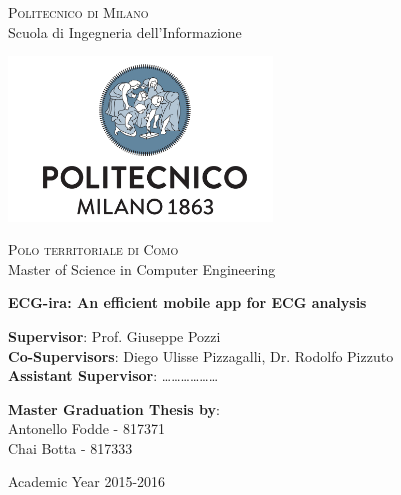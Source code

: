 \thispagestyle{empty}

\begin{center}

	\textsc{Politecnico di Milano}\\
 	Scuola di Ingegneria dell'Informazione\\  

 	\par\vskip 0.2cm

 	\includegraphics[width=7cm]{figures/polimi_logo.png}\\
  
 	\par\vskip 0.2cm  
  
  	\textsc{Polo territoriale di Como}\\
  	Master of Science in Computer Engineering\\  


  	\par\vskip 2cm
  	
\LARGE{ \bf	ECG-ira: An efficient mobile app for ECG analysis}


		
\end{center}

\par\vskip 1.5cm

\begin{flushleft}
  	\textbf{Supervisor}: Prof. Giuseppe Pozzi\\
  	\textbf{Co-Supervisors}: Diego Ulisse Pizzagalli, Dr. Rodolfo Pizzuto \\
    \textbf{Assistant Supervisor}: 	\dots\dots\dots\dots\dots\dots \\
\end{flushleft}

\par\vskip 1cm

\begin{flushleft}
  	\textbf{Master Graduation Thesis by}: \\
  	Antonello Fodde - 817371 \\ 
  	Chai Botta - 817333 \\  
\end{flushleft}

\par\vskip 1cm

\begin{center}
 	Academic Year 2015-2016
\end{center}





